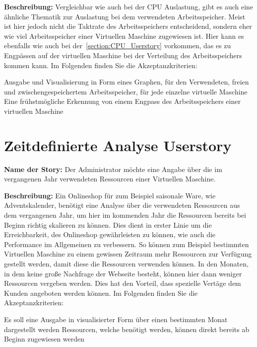 \textbf{Beschreibung:} Vergleichbar wie auch bei der CPU Auslastung, gibt es
auch eine ähnliche Thematik zur Auslastung bei dem verwendeten Arbeitsspeicher.
Meist ist hier jedoch nicht die Taktrate des Arbeitsspeichers entscheidend,
sondern eher wie viel Arbeitsspeicher einer Virtuellen Maschine zugewiesen ist.
Hier kann es ebenfalls wie auch bei der~\ref{section:CPU_Userstory}
vorkommen, das es zu Engpässen auf der virtuellen Maschine bei der Verteilung
des Arbeitsspeichers kommen kann. Im Folgenden finden Sie die
Akzeptanzkriterien:

\begin{outline}
  \1 Ausgabe und Visualisierung in Form eines Graphen, für den Verwendeten,
  freien und zwischengespeichertem Arbeitsspeicher, für jede einzelne virtuelle
  Maschine
  \1 Eine frühstmögliche Erkennung von einem Engpass des Arbeitsspeichers einer
  virtuellen Maschine
\end{outline}
\mr%

\section{Zeitdefinierte Analyse Userstory}
\textbf{Name der Story:} Der Administrator möchte eine Angabe über die im
vergangenen Jahr verwendeten Ressourcen einer Virtuellen Maschine.

\textbf{Beschreibung:} Ein Onlineshop für zum Beispiel saisonale Ware, wie
Adventskalender, benötigt eine Analyse über die verwendeten Ressourcen aus dem
vergangenen Jahr, um hier im kommenden Jahr die Ressourcen bereits bei Beginn
richtig skalieren zu können. Dies dient in erster Linie um die Erreichbarkeit,
des Onlineshop gewährleisten zu können, wie auch die Performance im Allgemeinen
zu verbessern. So können zum Beispiel bestimmten Virtuellen Maschine zu einem
gewissen Zeitraum mehr Ressourcen zur Verfügung gestellt werden, damit diese
die Ressourcen verwenden können. In den Monaten, in dem keine große Nachfrage
der Webseite besteht, können hier dann weniger Ressourcen vergeben werden. Dies
hat den Vorteil, dass spezielle Vertäge dem Kunden angeboten werden können. Im
Folgenden finden Sie die Akzeptanzkriterien:

\begin{outline}
  \1 Es soll eine Ausgabe in visualisierter Form über einen bestimmten Monat
  dargestellt werden
  \1 Ressourcen, welche benötigt werden, können direkt bereits ab Beginn
  zugewiesen werden
\end{outline}
\mr%

